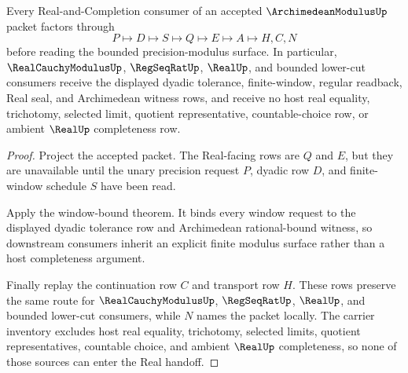 \begin{theorem}
\label{thm:archimedean-modulus-real-handoff}
Every Real-and-Completion consumer of an accepted $\ArchimedeanModulusUp$ packet factors through
$$
P \longmapsto D \longmapsto S \longmapsto Q \longmapsto E \longmapsto A \longmapsto H,C,N
$$
before reading the bounded precision-modulus surface. In particular, $\RealCauchyModulusUp$, $\RegSeqRatUp$, $\RealUp$, and bounded lower-cut consumers receive the displayed dyadic tolerance, finite-window, regular readback, Real seal, and Archimedean witness rows, and receive no host real equality, trichotomy, selected limit, quotient representative, countable-choice row, or ambient $\RealUp$ completeness row.
\end{theorem}
\begin{proof}
Project the accepted packet. The Real-facing rows are $Q$ and $E$, but they are unavailable until the unary precision request $P$, dyadic row $D$, and finite-window schedule $S$ have been read.

Apply the window-bound theorem. It binds every window request to the displayed dyadic tolerance row and Archimedean rational-bound witness, so downstream consumers inherit an explicit finite modulus surface rather than a host completeness argument.

Finally replay the continuation row $C$ and transport row $H$. These rows preserve the same route for $\RealCauchyModulusUp$, $\RegSeqRatUp$, $\RealUp$, and bounded lower-cut consumers, while $N$ names the packet locally. The carrier inventory excludes host real equality, trichotomy, selected limits, quotient representatives, countable choice, and ambient $\RealUp$ completeness, so none of those sources can enter the Real handoff.
\end{proof}


